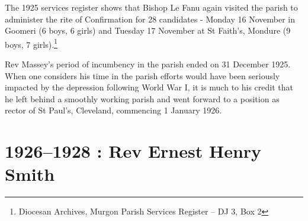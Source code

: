 The 1925 services register shows that Bishop Le Fanu again visited the parish to administer the rite of Confirmation for 28 candidates - Monday 16 November in Goomeri (6 boys, 6 girls) and Tuesday 17 November at St Faith's, Mondure (9 boys, 7 girls).\footnote{Diocesan Archives, Murgon Parish Services Register -- DJ 3, Box 2}


Rev Massey's period of incumbency in the parish ended on 31 December 1925. When one considers his time in the parish efforts would have been seriously impacted by the depression following World War I, it is much to his credit that he left behind a smoothly working parish and went forward to a position as rector of St Paul's, Cleveland, commencing 1 January 1926.



\balance


\printendnotes[custom]
\setcounter{endnote}{0}
\chapter{1926--1928 : Rev Ernest Henry Smith}
\nobalance








